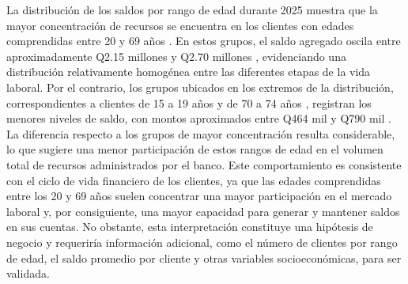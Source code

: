 La distribución de los saldos por rango de edad durante 2025 muestra que la mayor concentración de recursos se encuentra en los clientes con edades comprendidas entre
20 y 69 años
. En estos grupos, el saldo agregado oscila entre aproximadamente
Q2.15 millones
y
Q2.70 millones
, evidenciando una distribución relativamente homogénea entre las diferentes etapas de la vida laboral.
Por el contrario, los grupos ubicados en los extremos de la distribución, correspondientes a clientes de
15 a 19 años
y de
70 a 74 años
, registran los menores niveles de saldo, con montos aproximados entre
Q464 mil
y
Q790 mil
. La diferencia respecto a los grupos de mayor concentración resulta considerable, lo que sugiere una menor participación de estos rangos de edad en el volumen total de recursos administrados por el banco.
Este comportamiento es consistente con el ciclo de vida financiero de los clientes, ya que las edades comprendidas entre los 20 y 69 años suelen concentrar una mayor participación en el mercado laboral y, por consiguiente, una mayor capacidad para generar y mantener saldos en sus cuentas. No obstante, esta interpretación constituye una hipótesis de negocio y requeriría información adicional, como el número de clientes por rango de edad, el saldo promedio por cliente y otras variables socioeconómicas, para ser validada.